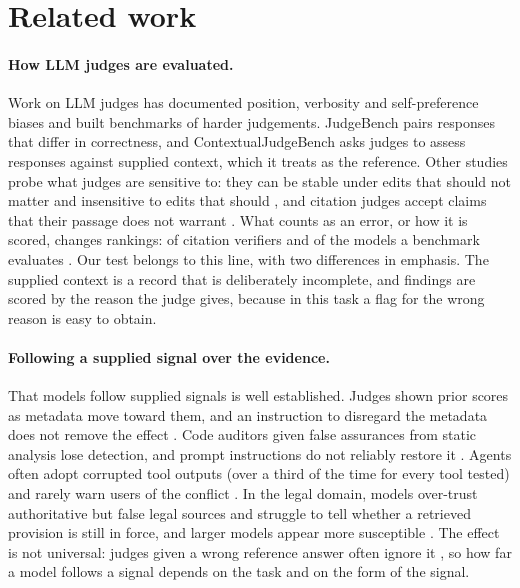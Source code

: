 \section{Related work}
\label{sec:related}

\paragraph{How LLM judges are evaluated.}
Work on LLM judges has documented position, verbosity and self-preference biases \citep{zheng2023judging} and built
benchmarks of harder judgements. JudgeBench \citep{tan2025judgebench} pairs responses that differ in correctness, and
ContextualJudgeBench \citep{xu2025contextualjudgebench} asks judges to assess responses against supplied context,
which it treats as the reference. Other studies probe what judges are sensitive to: they can be stable under edits
that should not matter and insensitive to edits that should \citep{chen2026judgeknow}, and citation judges accept
claims that their passage does not warrant \citep{qian2026relevant}. What counts as an error, or how it is
scored, changes rankings: of citation verifiers \citep{kim2026hallmark} and of the models a benchmark evaluates
\citep{pall2026scoring}. Our test belongs to this line, with two
differences in emphasis. The supplied context is a record that is deliberately incomplete, and findings are scored by
the reason the judge gives, because in this task a flag for the wrong reason is easy to obtain.

\paragraph{Following a supplied signal over the evidence.}
That models follow supplied signals is well established. Judges shown prior scores as metadata move toward them, and
an instruction to disregard the metadata does not remove the effect \citep{kapetanovic2026anchoring}. Code auditors
given false assurances from static analysis lose detection, and prompt instructions do not reliably restore it
\citep{liu2026trusting}. Agents often adopt corrupted tool outputs (over a third of the time for every
tool tested) and rarely warn users of the conflict \citep{yang2026overreliance}. In the legal domain, models over-trust authoritative but false legal sources and struggle to tell
whether a retrieved provision is still in force, and larger models appear more susceptible \citep{molfetta2026sycophants}. The effect is not
universal: judges given a wrong reference answer often ignore it \citep{lee2026reference}, so how far a model follows
a signal depends on the task and on the form of the signal.

